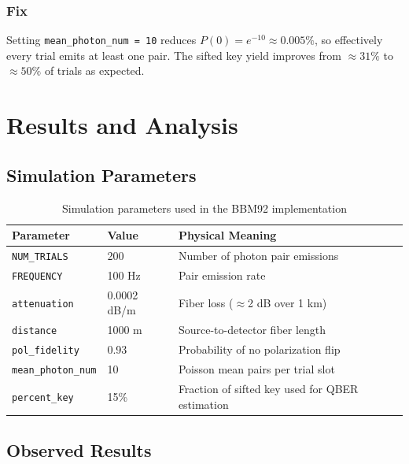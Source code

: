 \documentclass[12pt,oneside,letterpaper,english]{article}
\begin{document}
\subsubsection{Fix}
Setting \texttt{mean\_photon\_num = 10} reduces $P(0) = e^{-10} \approx 0.005\%$, so effectively every trial emits at least one pair. The sifted key yield improves from $\approx 31\%$ to $\approx 50\%$ of trials as expected.

\section{Results and Analysis}

\subsection{Simulation Parameters}

\begin{table}[h!]
\centering
\caption{Simulation parameters used in the BBM92 implementation}
\label{tab:params}
\begin{tabular}{lll}
\toprule
\textbf{Parameter}        & \textbf{Value}      & \textbf{Physical Meaning}                          \\
\midrule
\texttt{NUM\_TRIALS}      & 200                 & Number of photon pair emissions                    \\
\texttt{FREQUENCY}        & 100 Hz              & Pair emission rate                                 \\
\texttt{attenuation}      & 0.0002 dB/m         & Fiber loss ($\approx$2 dB over 1 km)               \\
\texttt{distance}         & 1000 m              & Source-to-detector fiber length                    \\
\texttt{pol\_fidelity}    & 0.93                & Probability of no polarization flip                \\
\texttt{mean\_photon\_num}& 10                  & Poisson mean pairs per trial slot                  \\
\texttt{percent\_key}     & 15\%                & Fraction of sifted key used for QBER estimation    \\
\bottomrule
\end{tabular}
\end{table}

\subsection{Observed Results}
\end{document}
